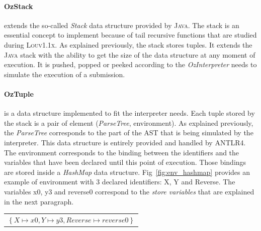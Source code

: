 \documentclass[11pt,a4paper,twoside,openright]{report}
\begin{document}
\paragraph{OzStack}
extends the so-called \textit{Stack} data structure provided by \textsc{Java}.
The stack is an essential concept to implement because of tail recursive 
functions that are studied during \textsc{Louv1.1x}. As explained previously, 
the stack stores tuples. It extends the \textsc{Java} stack with the ability to 
get the size of the data structure at any moment of execution. It is pushed, 
popped or peeked according to the \textit{OzInterpreter} needs to simulate the 
execution of a submission.

\paragraph{OzTuple}
is a data structure implemented to fit the interpreter needs. Each 
tuple stored by the stack is a pair of element (\textit{ParseTree}, 
environment). As explained previously, the \textit{ParseTree} corresponds to the 
part of the AST that is being simulated by the interpreter. This data structure 
is entirely provided and handled by \textsc{ANTLR4}. The environment corresponds 
to the binding between the identifiers and the variables that have been declared 
until this point of execution. Those bindings are stored inside a 
\textit{HashMap} data structure. Fig~\ref{fig:env_hashmap} provides an example 
of environment with 3 declared identifiers: X, Y and Reverse. The variables 
x0, y3 and reverse0 correspond to the \textit{store variables} that are 
explained in the next paragraph.\\

\begin{center}
 \begin{tabular}{l}
    $\left\{X \mapsto x0,Y\mapsto y3,Reverse \mapsto reverse0\right\}$
 \end{tabular}
 \label{fig:env_hashmap}
\end{center}
\end{document}
